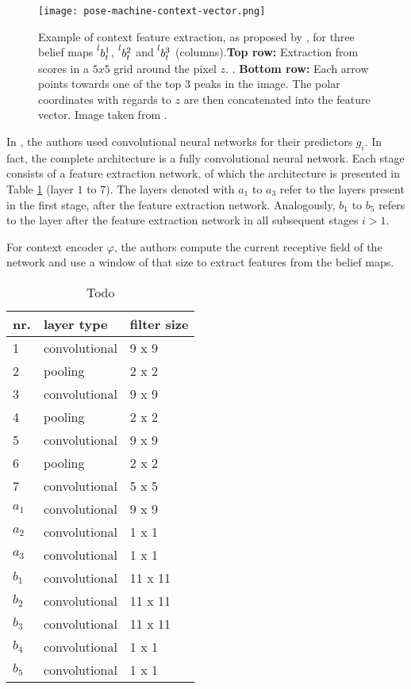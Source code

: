 \begin{figure}[htb!]
    \centering
    \texttt{[image: pose-machine-context-vector.png]}
    \caption{Example of context feature extraction, as proposed by \cite{ramakrishna_pose_2014}, for three belief maps $\prescript{l}{}{b_t^1}$, $\prescript{l}{}{b_t^2}$ and $\prescript{l}{}{b_t^3}$ (columns).\textbf{Top row:} Extraction from scores in a $5 x 5$ grid around the pixel $z$. . \textbf{Bottom row:} Each arrow points towards one of the top $3$ peaks in the image. The polar coordinates with regards to $z$ are then concatenated into the feature vector. Image taken from \cite{ramakrishna_pose_2014}.}
    \label{fig:pose-machines-context}
\end{figure}


In \cite{wei_convolutional_2016}, the authors used convolutional neural networks for their predictors $g_i$.
In fact, the complete architecture is a fully convolutional neural network.
Each stage consists of a feature extraction network, of which the architecture is presented in Table \ref{tab:pose-machine-feature-extraction-architecture} (layer $1$ to $7$).
The layers denoted with $a_1$ to $a_3$ refer to the layers present in the first stage, after the feature extraction network.
Analogously, $b_1$ to $b_5$ refers to the layer after the feature extraction network in all subsequent stages $i > 1$. 

For context encoder $\varphi$, the authors compute the current receptive field of the network and use a window of that size to extract features from the belief maps. 

\begin{table}[]
    \centering

    \begin{tabular}{|l|l|l|}
    \hline
    \textbf{nr.} & \textbf{layer type} & \textbf{filter size} \\ \hline
    1 & convolutional & 9 x 9 \\
    2 & pooling & 2 x 2\\
    3 & convolutional & 9 x 9 \\
    4 & pooling & 2 x 2\\
    5 & convolutional & 9 x 9 \\
    6 & pooling & 2 x 2 \\
    7 & convolutional & 5 x 5 \\ \hline 
    $a_1$ & convolutional & 9 x 9 \\  
    $a_2$ & convolutional & 1 x 1 \\  
    $a_3$ & convolutional & 1 x 1 \\ \hline 
    $b_1$ & convolutional & 11 x 11 \\  
    $b_2$ & convolutional & 11 x 11 \\  
    $b_3$ & convolutional & 11 x 11 \\ 
    $b_4$ & convolutional & 1 x 1 \\  
    $b_5$ & convolutional & 1 x 1 \\ \hline     
    \end{tabular}
    \caption{Todo}
    \label{tab:pose-machine-feature-extraction-architecture}
\end{table}

